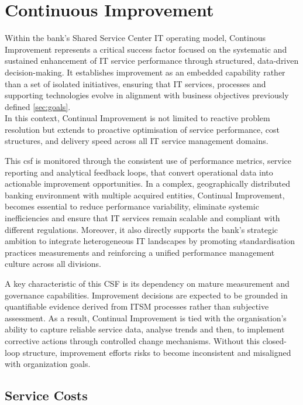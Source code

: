 
\chapter{Continuous Improvement}
\label{sec:continuousimprovement}

Within the bank's Shared Service Center IT operating model, Continous Improvement represents a critical success factor focused on the systematic and sustained enhancement of IT service performance through structured, data-driven decision-making. It establishes improvement as an embedded capability rather than a set of isolated initiatives, ensuring that IT services, processes and supporting technologies evolve in alignment with business objectives previously defined \ref{sec:goals}. \\
In this context, Continual Improvement is not limited to reactive problem resolution but extends to proactive optimisation of service performance, cost structures, and delivery speed across all IT service management domains.

This \gls{csf} is monitored through the consistent use of performance metrics, service reporting and analytical feedback loops, that convert operational data into actionable improvement opportunities. In a complex, geographically distributed banking environment with multiple acquired entities, Continual Improvement, becomes essential to reduce performance variability, eliminate systemic inefficiencies and ensure that IT services remain scalable and compliant with different regulations. 
Moreover, it also directly supports the bank's strategic ambition to integrate heterogeneous IT landscapes by promoting standardisation practices measurements and reinforcing a unified performance management culture across all divisions.

A key characteristic of this CSF is its dependency on mature measurement and governance capabilities. Improvement decisions are expected to be grounded in quantifiable evidence derived from ITSM processes rather than subjective assessment. As a result, Continual Improvement is tied with the organisation's ability to capture reliable service data, analyse trends and then, to implement corrective actions through controlled change mechanisms. Without this closed-loop structure, improvement efforts risks to become inconsistent and misaligned with organization goals.


\section{Service Costs}
\label{subs:servicecosts}


